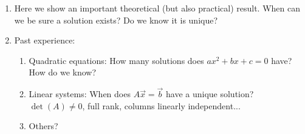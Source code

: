 \documentclass{article}
\begin{document}
\begin{enumerate}

\item Here we show an important theoretical (but also practical) result. When can we be sure a solution exists? Do we know it is unique?

\item Past experience: 
\begin{enumerate}
\item Quadratic equations: How many solutions does $ax^2 + bx + c = 0$ have? How do we know?
\item Linear systems: When does $A \vec{x} = \vec{b}$ have a unique solution? $\det(A)\neq 0$, full rank, columns linearly independent...
\item Others?
\end{enumerate}



\end{enumerate}
\end{document}
